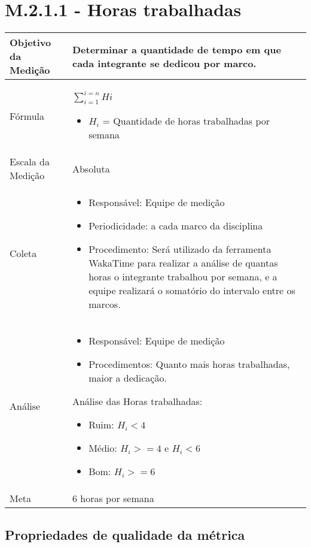 \section{M.2.1.1 - Horas trabalhadas} %

	\begin{tabular}{ |p{4cm}|p{8cm}|  }
	 \hline
	 Objetivo da Medição 		& Determinar a quantidade de tempo em que cada integrante se dedicou por marco.	   \\ %
	 \hline
	 Fórmula		&  $\sum_{i=1}^{i=n}{Hi}$	\begin{itemize} \item $H_i$ = Quantidade de horas trabalhadas por semana \end{itemize}\\
	 \hline
	 Escala da Medição 		& Absoluta		 \\ 
	 \hline
	 Coleta		& 	\begin{itemize} \item Responsável: Equipe de medição \item Periodicidade: a cada marco da disciplina \item Procedimento: Será utilizado da ferramenta WakaTime para realizar a análise de quantas horas o integrante trabalhou por semana, e a equipe realizará o somatório do intervalo entre os marcos.\end{itemize}	\\
	 \hline
	 Análise		& 	\begin{itemize} \item Responsável: Equipe de medição \item Procedimentos: Quanto mais horas trabalhadas, maior a dedicação. \end{itemize}	 

	 Análise das Horas trabalhadas:
	 \begin{itemize} \item Ruim: $H_i < 4$ \item Médio: $H_i >= 4 $ e $H_i < 6 $ \item Bom: $ H_i >= 6 $\end{itemize}

	 \\

	 \hline
	 Meta		& 	6 horas por semana	 \\
	 \hline
	\end{tabular}

	\subsection{Propriedades de qualidade da métrica}


